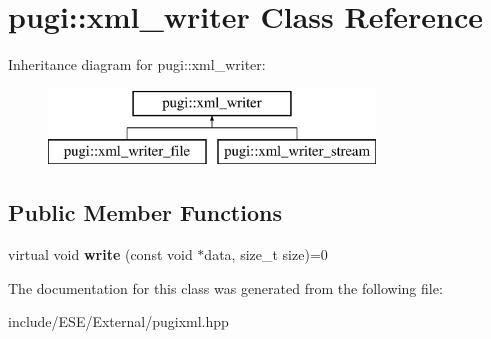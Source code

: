 \hypertarget{classpugi_1_1xml__writer}{\section{pugi\-:\-:xml\-\_\-writer Class Reference}
\label{classpugi_1_1xml__writer}
}
Inheritance diagram for pugi\-:\-:xml\-\_\-writer\-:\begin{figure}[H]
\begin{center}
\leavevmode
\includegraphics[height=2.000000cm]{classpugi_1_1xml__writer}
\end{center}
\end{figure}
\subsection*{Public Member Functions}
\begin{DoxyCompactItemize}
\item 
\hypertarget{classpugi_1_1xml__writer_ab7d3b6a8499ceef7799158370e1c2617}{virtual void {\bfseries write} (const void $\ast$data, size\-\_\-t size)=0}\label{classpugi_1_1xml__writer_ab7d3b6a8499ceef7799158370e1c2617}

\end{DoxyCompactItemize}


The documentation for this class was generated from the following file\-:\begin{DoxyCompactItemize}
\item 
include/\-E\-S\-E/\-External/pugixml.\-hpp\end{DoxyCompactItemize}
